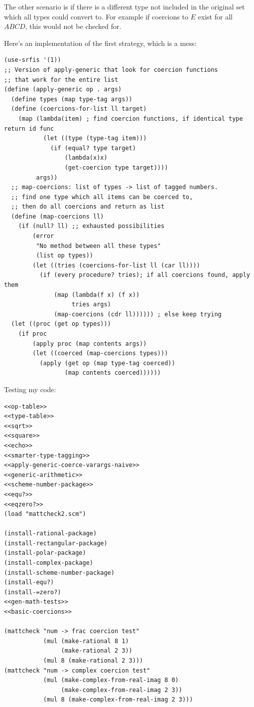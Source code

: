 \documentclass[final,fleqn,titlepage,twoside]{article}
\begin{document}
The other scenario is if there is a different type not included in the original
set which all types could convert to. For example if coercions to \(E\) exist
for all \(ABCD\), this would not be checked for.

Here's an implementation of the first strategy, which is a mess:

\begin{verbatim}
(use-srfis '(1))
;; Version of apply-generic that look for coercion functions
;; that work for the entire list
(define (apply-generic op . args)
  (define types (map type-tag args))
  (define (coercions-for-list ll target)
    (map (lambda(item) ; find coercion functions, if identical type return id func
           (let ((type (type-tag item)))
             (if (equal? type target)
                 (lambda(x)x)
                 (get-coercion type target))))
         args))
  ;; map-coercions: list of types -> list of tagged numbers.
  ;; find one type which all items can be coerced to,
  ;; then do all coercions and return as list
  (define (map-coercions ll)
    (if (null? ll) ;; exhausted possibilities
        (error
         "No method between all these types"
         (list op types))
        (let ((tries (coercions-for-list ll (car ll))))
          (if (every procedure? tries); if all coercions found, apply them
              (map (lambda(f x) (f x))  
                   tries args)
              (map-coercions (cdr ll)))))) ; else keep trying
  (let ((proc (get op types)))
    (if proc
        (apply proc (map contents args))
        (let ((coerced (map-coercions types)))
          (apply (get op (map type-tag coerced))
                 (map contents coerced))))))
\end{verbatim}

Testing my code:

\begin{verbatim}
<<op-table>>
<<type-table>>
<<sqrt>>
<<square>>
<<echo>>
<<smarter-type-tagging>>
<<apply-generic-coerce-varargs-naive>>
<<generic-arithmetic>>
<<scheme-number-package>>
<<equ?>>
<<eqzero?>>
(load "mattcheck2.scm")

(install-rational-package)
(install-rectangular-package)
(install-polar-package)
(install-complex-package)
(install-scheme-number-package)
(install-equ?)
(install-=zero?)
<<gen-math-tests>>
<<basic-coercions>>

(mattcheck "num -> frac coercion test"
           (mul (make-rational 8 1)
                (make-rational 2 3))
           (mul 8 (make-rational 2 3)))
(mattcheck "num -> complex coercion test"
           (mul (make-complex-from-real-imag 8 0)
                (make-complex-from-real-imag 2 3))
           (mul 8 (make-complex-from-real-imag 2 3)))
\end{verbatim}
\end{document}
